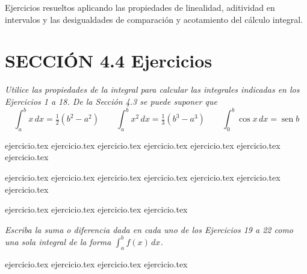 
Ejercicios resueltos aplicando las propiedades de linealidad, aditividad en intervalos y las desigualdades de comparación y acotamiento del cálculo integral.

\section*{SECCIÓN 4.4 \quad Ejercicios}

\noindent \textit{Utilice las propiedades de la integral para calcular las integrales indicadas en los Ejercicios 1 a 18. De la Sección 4.3 se puede suponer que}
$$\int_a^b x \, dx = \tfrac{1}{2}(b^2 - a^2) \qquad \int_a^b x^2 \, dx = \tfrac{1}{3}(b^3 - a^3) \qquad \int_0^b \cos x \, dx = \operatorname{sen} b$$

\begin{enumerate}
    \begin{minipage}{0.45\textwidth}
    {ejercicio.tex}
    {ejercicio.tex}
    {ejercicio.tex}
    {ejercicio.tex}
    {ejercicio.tex}
    {ejercicio.tex}
    {ejercicio.tex}
    \end{minipage}%
    \begin{minipage}{0.45\textwidth}
    {ejercicio.tex}
    {ejercicio.tex}
    {ejercicio.tex}
    {ejercicio.tex}
    {ejercicio.tex}
    {ejercicio.tex}
    {ejercicio.tex}
    \end{minipage}
\end{enumerate}

\begin{enumerate}
    \setcounter{enumi}{14}
    {ejercicio.tex}
    {ejercicio.tex}
    {ejercicio.tex}
    {ejercicio.tex}
\end{enumerate}

\vspace{1em}
\noindent \textit{Escriba la suma o diferencia dada en cada uno de los Ejercicios 19 a 22 como una sola integral de la forma $\int_a^b f(x) \, dx$.}

\begin{enumerate}
    \setcounter{enumi}{18}
    {ejercicio.tex}
    {ejercicio.tex}
    {ejercicio.tex}
    {ejercicio.tex}
\end{enumerate}

